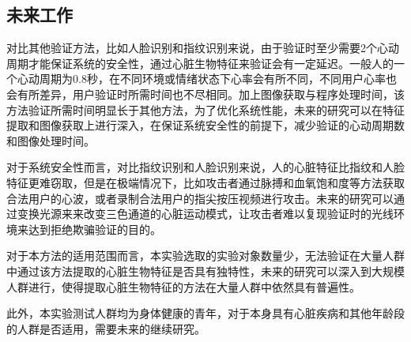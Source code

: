 \begin{conclusion}
\section{未来工作}
{对比其他验证方法，比如人脸识别和指纹识别来说，由于验证时至少需要2个心动周期才能保证系统的安全性，通过心脏生物特征来验证会有一定延迟。一般人的一个心动周期为0.8秒，在不同环境或情绪状态下心率会有所不同，不同用户心率也会有所差异，用户验证时所需时间也不尽相同。加上图像获取与程序处理时间，该方法验证所需时间明显长于其他方法，为了优化系统性能，未来的研究可以在特征提取和图像获取上进行深入，在保证系统安全性的前提下，减少验证的心动周期数和图像处理时间。}
\par
{对于系统安全性而言，对比指纹识别和人脸识别来说，人的心脏特征比指纹和人脸特征更难窃取，但是在极端情况下，比如攻击者通过脉搏和血氧饱和度等方法获取合法用户的心波，或者录制合法用户的指尖按压视频进行攻击。未来的研究可以通过变换光源来来改变三色通道的心脏运动模式，让攻击者难以复现验证时的光线环境来达到拒绝欺骗验证的目的。}
\par
{对于本方法的适用范围而言，本实验选取的实验对象数量少，无法验证在大量人群中通过该方法提取的心脏生物特征是否具有独特性，未来的研究可以深入到大规模人群进行，使得提取心脏生物特征的方法在大量人群中依然具有普遍性。}
\par
{此外，本实验测试人群均为身体健康的青年，对于本身具有心脏疾病和其他年龄段的人群是否适用，需要未来的继续研究。}
\end{conclusion}

